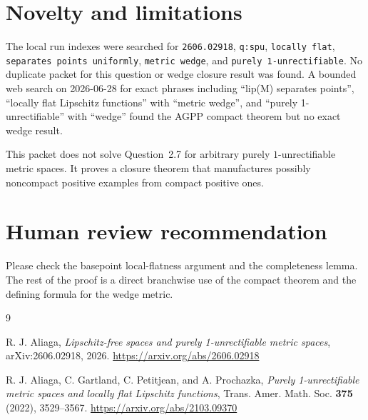 \documentclass[11pt]{amsart}
\begin{document}
\section*{Novelty and limitations}

The local run indexes were searched for \texttt{2606.02918}, \texttt{q:spu},
\texttt{locally flat}, \texttt{separates points uniformly}, \texttt{metric
wedge}, and \texttt{purely 1-unrectifiable}.  No duplicate packet for this
question or wedge closure result was found.  A bounded web search on
2026-06-28 for exact phrases including ``lip(M) separates points'',
``locally flat Lipschitz functions'' with ``metric wedge'', and ``purely
1-unrectifiable'' with ``wedge'' found the AGPP compact theorem but no exact
wedge result.

This packet does not solve Question~2.7 for arbitrary purely
$1$-unrectifiable metric spaces.  It proves a closure theorem that manufactures
possibly noncompact positive examples from compact positive ones.

\section*{Human review recommendation}

Please check the basepoint local-flatness argument and the completeness lemma.
The rest of the proof is a direct branchwise use of the compact theorem and
the defining formula for the wedge metric.

\begin{thebibliography}{9}

R. J. Aliaga,
\emph{Lipschitz-free spaces and purely 1-unrectifiable metric spaces},
arXiv:2606.02918, 2026.
\url{https://arxiv.org/abs/2606.02918}

R. J. Aliaga, C. Gartland, C. Petitjean, and A. Prochazka,
\emph{Purely 1-unrectifiable metric spaces and locally flat Lipschitz functions},
Trans. Amer. Math. Soc. \textbf{375} (2022), 3529--3567.
\url{https://arxiv.org/abs/2103.09370}

\end{thebibliography}
\end{document}
